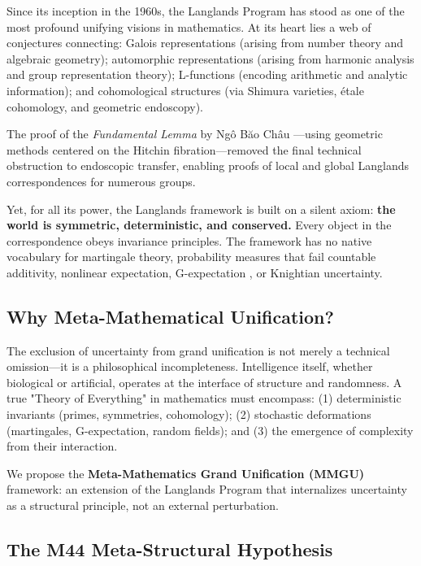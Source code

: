 \documentclass[11pt,a4paper]{article}
\theoremstyle{definition}
\begin{document}
Since its inception in the 1960s, the Langlands Program has stood as one of the most profound unifying visions in mathematics. At its heart lies a web of conjectures connecting: Galois representations (arising from number theory and algebraic geometry); automorphic representations (arising from harmonic analysis and group representation theory); L-functions (encoding arithmetic and analytic information); and cohomological structures (via Shimura varieties, \'etale cohomology, and geometric endoscopy).

The proof of the \emph{Fundamental Lemma} by Ng\^o B\u{a}o Ch\^au \cite{ngo2010}---using geometric methods centered on the Hitchin fibration---removed the final technical obstruction to endoscopic transfer, enabling proofs of local and global Langlands correspondences for numerous groups.

Yet, for all its power, the Langlands framework is built on a silent axiom: \textbf{the world is symmetric, deterministic, and conserved.} Every object in the correspondence obeys invariance principles. The framework has no native vocabulary for martingale theory, probability measures that fail countable additivity, nonlinear expectation, G-expectation \cite{peng2007,peng2008,peng2019}, or Knightian uncertainty.

\subsection{Why Meta-Mathematical Unification?}

The exclusion of uncertainty from grand unification is not merely a technical omission---it is a philosophical incompleteness. Intelligence itself, whether biological or artificial, operates at the interface of structure and randomness. A true "Theory of Everything" in mathematics must encompass: (1) deterministic invariants (primes, symmetries, cohomology); (2) stochastic deformations (martingales, G-expectation, random fields); and (3) the emergence of complexity from their interaction.

We propose the \textbf{Meta-Mathematics Grand Unification (MMGU)} framework: an extension of the Langlands Program that internalizes uncertainty as a structural principle, not an external perturbation.

\subsection{The M44 Meta-Structural Hypothesis}
\end{document}
